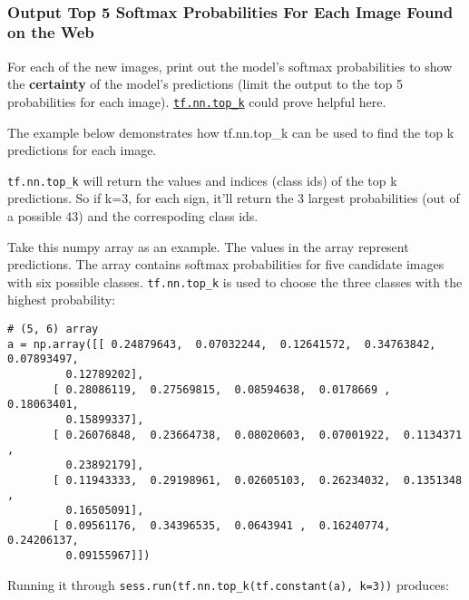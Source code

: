 \documentclass[11pt]{article}
\begin{document}
    \begin{center}
    \end{center}
    { \hspace*{\fill} \\}
    
    \hypertarget{output-top-5-softmax-probabilities-for-each-image-found-on-the-web}{%
\subsubsection{Output Top 5 Softmax Probabilities For Each Image Found
on the
Web}\label{output-top-5-softmax-probabilities-for-each-image-found-on-the-web}}

    For each of the new images, print out the model's softmax probabilities
to show the \textbf{certainty} of the model's predictions (limit the
output to the top 5 probabilities for each image).
\href{https://www.tensorflow.org/versions/r0.12/api_docs/python/nn.html\#top_k}{\texttt{tf.nn.top\_k}}
could prove helpful here.

The example below demonstrates how tf.nn.top\_k can be used to find the
top k predictions for each image.

\texttt{tf.nn.top\_k} will return the values and indices (class ids) of
the top k predictions. So if k=3, for each sign, it'll return the 3
largest probabilities (out of a possible 43) and the correspoding class
ids.

Take this numpy array as an example. The values in the array represent
predictions. The array contains softmax probabilities for five candidate
images with six possible classes. \texttt{tf.nn.top\_k} is used to
choose the three classes with the highest probability:

\begin{verbatim}
# (5, 6) array
a = np.array([[ 0.24879643,  0.07032244,  0.12641572,  0.34763842,  0.07893497,
         0.12789202],
       [ 0.28086119,  0.27569815,  0.08594638,  0.0178669 ,  0.18063401,
         0.15899337],
       [ 0.26076848,  0.23664738,  0.08020603,  0.07001922,  0.1134371 ,
         0.23892179],
       [ 0.11943333,  0.29198961,  0.02605103,  0.26234032,  0.1351348 ,
         0.16505091],
       [ 0.09561176,  0.34396535,  0.0643941 ,  0.16240774,  0.24206137,
         0.09155967]])
\end{verbatim}

Running it through \texttt{sess.run(tf.nn.top\_k(tf.constant(a),\ k=3))}
produces:
\end{document}
